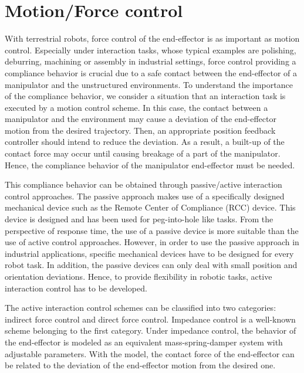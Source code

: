 \section{Motion/Force control}
With terrestrial robots, force control of the end-effector is as important as motion control.
Especially under interaction tasks,
whose typical examples are polishing, deburring, machining or assembly in industrial settings,
force control providing a compliance behavior
is crucial due to a safe contact between the end-effector of a manipulator and
the unstructured environments.
To understand the importance of the compliance behavior,
we consider a situation that an interaction task is executed by a motion control scheme.
In this case,
the contact between a manipulator and the environment
may cause a deviation of the end-effector motion from the desired trajectory.
Then, an appropriate position feedback controller should intend to reduce the deviation.
As a result,
a built-up of the contact force may occur until causing breakage of a part of the manipulator.
Hence, the compliance behavior of the manipulator end-effector must be needed.

This compliance behavior can be obtained through passive/active interaction control approaches.
The passive approach makes use of a specifically designed
mechanical device such as the Remote Center of Compliance (RCC) device.
This device is designed and has been used for peg-into-hole like tasks.
From the perspective of response time,
the use of a passive device is more suitable than the use of active control approaches.
However, in order to use the passive approach in industrial applications,
specific mechanical devices have to be designed for every robot task.
In addition, the passive devices can only deal with small position and orientation deviations.
Hence, to provide flexibility in robotic tasks,
active interaction control has to be developed.

The active interaction control schemes can be classified into two categories:
indirect force control and direct force control.
Impedance control is a well-known scheme belonging to the first category.
Under impedance control,
the behavior of the end-effector is modeled as an equivalent mass-spring-damper system with
adjustable parameters.
With the model, the contact force of the end-effector
can be related to the deviation of the end-effector motion from the desired one.

